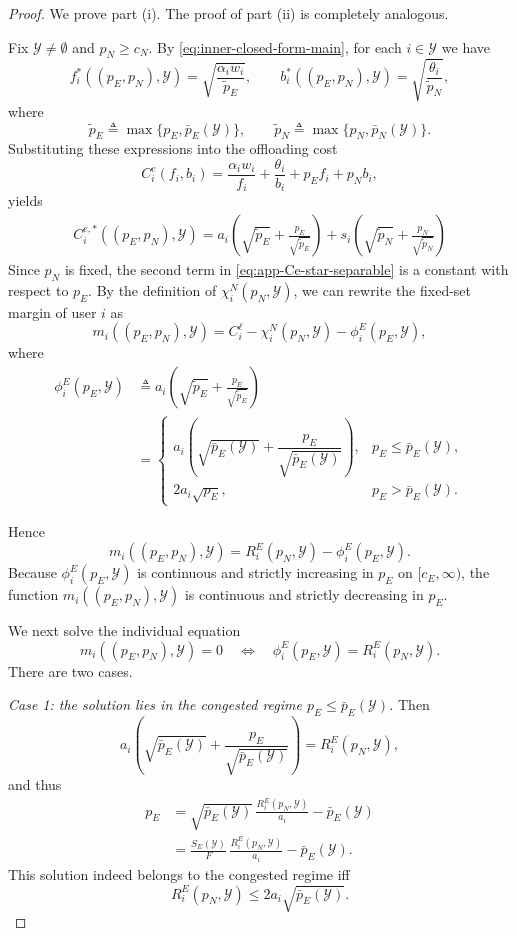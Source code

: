 \documentclass[lettersize,journal]{IEEEtran}
\begin{document}
\begin{proof}
We prove part (i). The proof of part (ii) is completely analogous.

Fix $\mathcal Y\neq\emptyset$ and $p_N\ge c_N$. By \eqref{eq:inner-closed-form-main},
for each $i\in\mathcal Y$ we have
\[
f_i^*((p_E,p_N),\mathcal Y)
=
\sqrt{\frac{\alpha_i w_i}{\tilde p_E}},
\qquad
b_i^*((p_E,p_N),\mathcal Y)
=
\sqrt{\frac{\theta_i}{\tilde p_N}},
\]
where
\[
\tilde p_E\triangleq \max\{p_E,\bar p_E(\mathcal Y)\},
\qquad
\tilde p_N\triangleq \max\{p_N,\bar p_N(\mathcal Y)\}.
\]
Substituting these expressions into the offloading cost
\[
C_i^e(f_i,b_i)
=
\frac{\alpha_i w_i}{f_i}
+
\frac{\theta_i}{b_i}
+
p_E f_i
+
p_N b_i,
\]
yields
\begin{align}
C_i^{e,*}((p_E,p_N),\mathcal Y)=
a_i\!\left(
\sqrt{\tilde p_E}
+\frac{p_E}{\sqrt{\tilde p_E}}
\right)
+
s_i\!\left(
\sqrt{\tilde p_N}
+\frac{p_N}{\sqrt{\tilde p_N}}
\right)
\label{eq:app-Ce-star-separable}
\end{align}
Since $p_N$ is fixed, the second term in \eqref{eq:app-Ce-star-separable} is a constant with respect to $p_E$.
By the definition of $\chi_i^N(p_N,\mathcal Y)$, we can rewrite the fixed-set margin of user $i$ as
\[
m_i((p_E,p_N),\mathcal Y)
=
C_i^\ell
-
\chi_i^N(p_N,\mathcal Y)
-
\phi_i^E(p_E,\mathcal Y),
\]
where
\begin{align*}
    \phi_i^E(p_E,\mathcal Y)
&\triangleq
a_i\!\left(
\sqrt{\tilde p_E}
+\frac{p_E}{\sqrt{\tilde p_E}}
\right)\\
&=
\begin{cases}
a_i\!\left(
\sqrt{\bar p_E(\mathcal Y)}
+\dfrac{p_E}{\sqrt{\bar p_E(\mathcal Y)}}
\right),
& p_E\le \bar p_E(\mathcal Y),\\[2ex]
2a_i\sqrt{p_E},
& p_E>\bar p_E(\mathcal Y).
\end{cases}
\end{align*}

Hence
\[
m_i((p_E,p_N),\mathcal Y)
=
R_i^E(p_N,\mathcal Y)-\phi_i^E(p_E,\mathcal Y).
\]
Because $\phi_i^E(p_E,\mathcal Y)$ is continuous and strictly increasing in $p_E$ on $[c_E,\infty)$,
the function $m_i((p_E,p_N),\mathcal Y)$ is continuous and strictly decreasing in $p_E$.

We next solve the individual equation
\[
m_i((p_E,p_N),\mathcal Y)=0
\quad\Longleftrightarrow\quad
\phi_i^E(p_E,\mathcal Y)=R_i^E(p_N,\mathcal Y).
\]
There are two cases.

\emph{Case 1: the solution lies in the congested regime $p_E\le \bar p_E(\mathcal Y)$.}
Then
\[
a_i\!\left(
\sqrt{\bar p_E(\mathcal Y)}
+\frac{p_E}{\sqrt{\bar p_E(\mathcal Y)}}
\right)
=
R_i^E(p_N,\mathcal Y),
\]
and thus
\begin{align*}
 p_E
&=
\sqrt{\bar p_E(\mathcal Y)}\,
\frac{R_i^E(p_N,\mathcal Y)}{a_i}
-
\bar p_E(\mathcal Y)\\
&=
\frac{S_E(\mathcal Y)}{F}\,
\frac{R_i^E(p_N,\mathcal Y)}{a_i}
-
\bar p_E(\mathcal Y).   
\end{align*}
This solution indeed belongs to the congested regime iff
\[
R_i^E(p_N,\mathcal Y)\le 2a_i\sqrt{\bar p_E(\mathcal Y)}.
\]


\end{proof}
\end{document}
